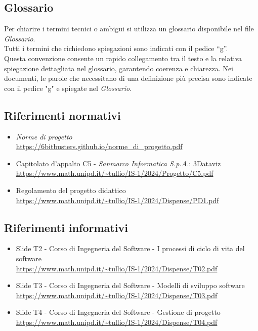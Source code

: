 \subsection{Glossario}
Per chiarire i termini tecnici o ambigui si utilizza un glossario disponibile nel file \textit{Glossario}.\\
Tutti i termini che richiedono spiegazioni sono indicati con il pedice “g”. \\
Questa convenzione consente un rapido collegamento tra il testo e la relativa spiegazione dettagliata nel glossario, garantendo coerenza e chiarezza.  Nei documenti, le parole che necessitano di una definizione più precisa sono indicate con il pedice "g" e spiegate nel \textit{Glossario}.

\subsection{Riferimenti normativi}
\begin{itemize}
      \item \textit{Norme di progetto} \\ \url{https://6bitbusters.github.io/norme_di_progetto.pdf}
      \item Capitolato d'appalto C5 - \textit{Sanmarco Informatica S.p.A.}: 3Dataviz \\ \url{https://www.math.unipd.it/~tullio/IS-1/2024/Progetto/C5.pdf}
      \item Regolamento del progetto didattico \\ \url{https://www.math.unipd.it/~tullio/IS-1/2024/Dispense/PD1.pdf}
\end{itemize}
\subsection{Riferimenti informativi}
\begin{itemize}
      \item Slide T2 - Corso di Ingegneria del Software - I processi di ciclo di vita del software\\ \url{https://www.math.unipd.it/~tullio/IS-1/2024/Dispense/T02.pdf}
      \item Slide T3 - Corso di Ingegneria del Software - Modelli di sviluppo software \\ \url{https://www.math.unipd.it/~tullio/IS-1/2024/Dispense/T03.pdf}
      \item Slide T4 - Corso di Ingegneria del Software - Gestione di progetto \\ \url{https://www.math.unipd.it/~tullio/IS-1/2024/Dispense/T04.pdf}
\end{itemize}
